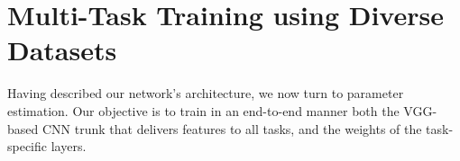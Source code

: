 \documentclass[10pt,twocolumn,letterpaper]{article}
\begin{document}










 
 \section{Multi-Task Training using Diverse Datasets}
\label{datasets}
\label{diverse}
 \newcommand{\viss}[1]{\mathbf{V}}
 \newcommand{\vis}[1]{\mathbf{v}_{#1}}
 \newcommand{\prd}[2]{\mathbf{f}^{#2}_{#1}}
 \newcommand{\gt}[2]{\mathbf{y}^{#2}_{#1}}
 \newcommand{\raw}[2]{\mathbf{I}^{#1}_{#2}}
 \newcommand{\prmm}[1]{\mathbf{W}_{#1}}
 \newcommand{\prm}[1]{\mathbf{w}_{#1}}
 \newcommand{\cnnw}[1]{\mathbf{w}^{#1}}
 \newcommand{\prms}[1]{\mathbf{\ww}_{#1}}
 \newcommand{\reg}[1]{\mathcal{R}(#1)}
 \newcommand{\task}{t}
 \newcommand{\losst}[3]{L_{#1}\left(#2,#3\right)}
  \newcommand{\losstwo}[2]{L_{#1}\left(#2\right)}
  \newcommand{\lossd}[3]{L'_{#1}\left(#2,#3\right)}
\newcommand{\lossdd}[4]{\nabla_{#4}L_{#1}\left(#2,#3\right)}
 \newcommand{\mydelta}[2]{\delta_{#1,#2}}
 \newcommand{\cnn}{0}
 Having described our network's architecture, we now turn to  parameter estimation. 
 Our objective is to train in an end-to-end manner both the VGG-based CNN trunk that delivers features to all tasks, and the weights of the task-specific layers. 
 
\end{document}

